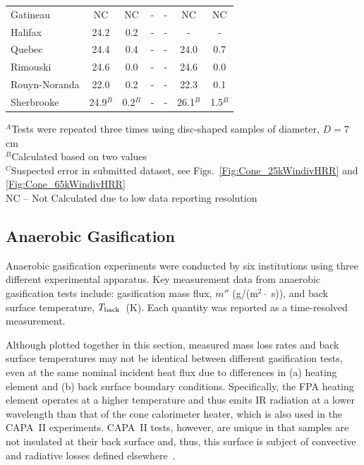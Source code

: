 \documentclass{book}
\begin{document}
\begin{table}[h!]
\begin{center}
\begin{tabular}{|l|cc|cc|cc|}
Gatineau                                & NC       & NC                     & -                     & -                      & NC                    & NC                        \\
Halifax                                 & 24.2     & 0.2                    & -                     & -                      & -                     & -                         \\
Quebec                                  & 24.4     & 0.4                    & -                     & -                      & 24.0                  & 0.7                       \\
Rimouski                                & 24.6     & 0.0                    & -                     & -                      & 24.6                  & 0.0                       \\
Rouyn-Noranda                           & 22.0     & 0.2                    & -                     & -                      & 22.3                  & 0.1                       \\
Sherbrooke                              & 24.9$^B$ & 0.2$^B$                & -                     & -                      & 26.1$^B$              & 1.5$^B$                   \\ \hline
\end{tabular}
\end{center}
$^A$Tests were repeated three times using disc-shaped samples of diameter, $D = 7$ cm \\
$^B$Calculated based on two values \\
$^C$Suspected error in submitted dataset, see Figs.~\ref{Fig:Cone_25kWindivHRR} and \ref{Fig:Cone_65kWindivHRR} \\
NC – Not Calculated due to low data reporting resolution
\end{table}


\newpage
\subsection{Anaerobic Gasification}

Anaerobic gasification experiments were conducted by six institutions using three different experimental apparatus. Key measurement data from anaerobic gasification tests include: gasification mass flux, $\dot{m}''$ (g/(m$^2 \cdot$ s)), and back surface temperature, $T_{\rm back}$~(K). Each quantity was reported as a time-resolved measurement.

Although plotted together in this section, measured mass loss rates and back surface temperatures may not be identical between different gasification tests, even at the same nominal incident heat flux due to differences in (a) heating element and (b) back surface boundary conditions. Specifically, the FPA heating element operates at a higher temperature and thus emits IR radiation at a lower wavelength than that of the cone calorimeter heater, which is also used in the CAPA~II experiments. CAPA~II tests, however, are unique in that samples are not insulated at their back surface and, thus, this surface is subject of convective and radiative losses defined elsewhere~\cite{swann2017controlled}.
\end{document}
